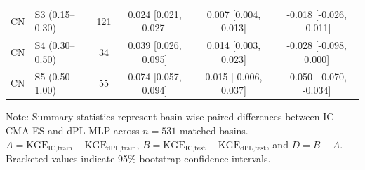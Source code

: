 \begin{table}[t]
\begin{threeparttable}
\begin{tabular}{llcccc}
CN & S3 (0.15–0.30) & 121 & 0.024 [0.021, 0.027] & 0.007 [0.004, 0.013] & -0.018 [-0.026, -0.011] \\
CN & S4 (0.30–0.50) & 34 & 0.039 [0.026, 0.095] & 0.014 [0.003, 0.023] & -0.028 [-0.098, 0.000] \\
CN & S5 (0.50–1.00) & 55 & 0.074 [0.057, 0.094] & 0.015 [-0.006, 0.037] & -0.050 [-0.070, -0.034] \\
\bottomrule
\end{tabular}
\begin{tablenotes}
\small
\item Note: Summary statistics represent basin-wise paired differences between IC-CMA-ES and dPL-MLP across $n = 531$ matched basins. $A = \text{KGE}_{\text{IC,train}} - \text{KGE}_{\text{dPL,train}}$, $B = \text{KGE}_{\text{IC,test}} - \text{KGE}_{\text{dPL,test}}$, and $D = B - A$. Bracketed values indicate 95\% bootstrap confidence intervals.
\end{tablenotes}
\end{threeparttable}
\end{table}
